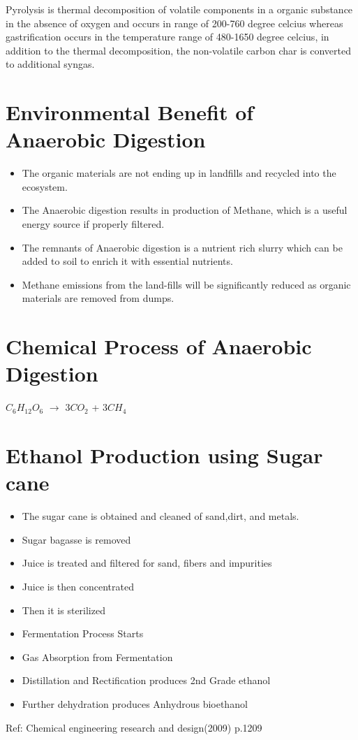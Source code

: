 \documentclass[12pt,a4paper]{article}
\begin{document}
Pyrolysis is thermal decomposition of volatile components in a organic substance in the absence of oxygen and occurs in range of 200-760 degree celcius whereas gastrification occurs in the temperature range of 480-1650 degree celcius, in addition to the thermal decomposition, the non-volatile carbon char is converted to additional syngas. 

\section{Environmental Benefit of Anaerobic Digestion}
\begin{itemize}
        \item The organic materials are not ending up in landfills and recycled into the ecosystem.
        \item The Anaerobic digestion results in production of Methane, which is a useful energy source if properly filtered.
        \item The remnants of Anaerobic digestion is a nutrient rich slurry which can be added to soil to enrich it with essential nutrients.
        \item Methane emissions from the land-fills will be significantly reduced as organic materials are removed from dumps. 

\end{itemize} 

\section{Chemical Process of Anaerobic Digestion}

$C_{6}H_{12}O_{6}$ $\rightarrow$ $3CO_{2}$ + $3CH_{4}$

\section{Ethanol Production using Sugar cane}

\begin{itemize}
        \item The sugar cane is obtained and cleaned of sand,dirt, and metals.
            \item Sugar bagasse is removed
            \item Juice is treated and filtered for sand, fibers and impurities
            \item Juice is then concentrated
            \item Then it is sterilized
            \item Fermentation Process Starts
            \item Gas Absorption from Fermentation
            \item Distillation and Rectification produces 2nd Grade ethanol
            \item Further dehydration produces Anhydrous bioethanol
\end{itemize}
Ref: Chemical engineering research and design(2009) p.1209

\newpage

\printbibliography[heading=bibliography,title={References}]
\end{document}
